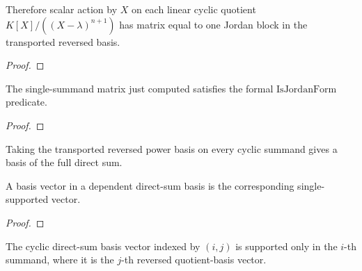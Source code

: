 \begin{theorem}
  \label{thm:linear_quotient_single_block}
  \leanok
  Therefore scalar action by \(X\) on each linear cyclic quotient
  \(K[X]/((X-\lambda)^{n+1})\) has matrix equal to one Jordan block in the
  transported reversed basis.
\end{theorem}

\begin{proof}
  \leanok
\end{proof}

\begin{theorem}
  \label{thm:linear_quotient_is_jordan_form}
  \leanok
  The single-summand matrix just computed satisfies the formal
  \(\mathrm{IsJordanForm}\) predicate.
\end{theorem}

\begin{proof}
  \leanok
\end{proof}

\begin{definition}
  \label{def:linear_quotient_direct_sum_basis}
  \leanok
  Taking the transported reversed power basis on every cyclic summand gives a
  basis of the full direct sum.
\end{definition}

\begin{theorem}
  \label{thm:dfinsupp_basis_apply}
  \leanok
  A basis vector in a dependent direct-sum basis is the corresponding
  single-supported vector.
\end{theorem}

\begin{proof}
  \leanok
\end{proof}

\begin{theorem}
  \label{thm:linear_quotient_direct_sum_basis_apply}
  \leanok
  The cyclic direct-sum basis vector indexed by \((i,j)\) is supported only in
  the \(i\)-th summand, where it is the \(j\)-th reversed quotient-basis vector.
\end{theorem}

